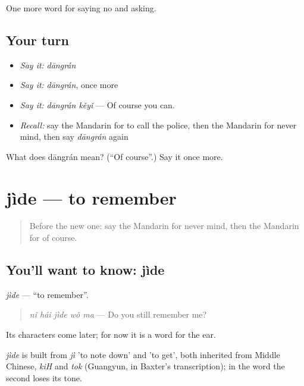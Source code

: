 \begin{grammarlens}[title={What you've built}]
One more word for saying no and asking.
\end{grammarlens}

\subsection*{Your turn}
\begin{itemize}
\raggedright
  \item \emph{Say it:} \emph{dāngrán}
  \item \emph{Say it:} \emph{dāngrán}, once more
  \item \emph{Say it:} \emph{dāngrán kěyǐ} — Of course you can.
  \item \emph{Recall:} say the Mandarin for to call the police, then the Mandarin for never mind, then say \emph{dāngrán} again
\end{itemize}

\begin{tcolorbox}[breakable,colback=teal!4,colframe=teal!35!black,title={Before you move on}]
What does dāngrán mean? (\textquotedblleft{}Of course\textquotedblright{}.) Say it once more.
\end{tcolorbox}
\section[jìde]{jìde — to remember}

\label{lesson:ZH-C217-jide}



\begin{quote}
Before the new one: say the Mandarin for never mind, then the Mandarin for of course.
\end{quote}

\subsection*{You'll want to know: jìde}
\emph{jìde} — \textquotedblleft{}to remember\textquotedblright{}.

\begin{quote}
\emph{nǐ hái jìde wǒ ma} — Do you still remember me?
\end{quote}

Its characters come later; for now it is a word for the ear.

\begin{cousinweb}
\emph{jìde} is built from \emph{jì} 'to note down' and  'to get', both inherited from Middle Chinese, \emph{kiH} and \emph{tok} (Guangyun, in Baxter's transcription); in the word the second loses its tone.
\end{cousinweb}

